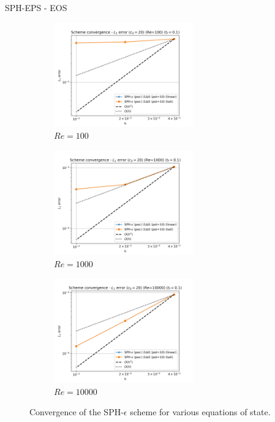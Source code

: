 SPH-EPS - EOS 
\begin{figure}[H]
  \begin{subfigure}{7cm}
  \centering\includegraphics[width=6cm]{Code-Figures/mon2017/eos/dt_pois_conv_c0_20_re_100.png}
  \caption{$Re = 100$}
  \end{subfigure}
  \begin{subfigure}{7cm}
  \centering\includegraphics[width=6cm]{Code-Figures/mon2017/eos/dt_pois_conv_c0_20_re_1000.png}
  \caption{$Re = 1000$}
  \end{subfigure}
  \begin{subfigure}{7cm}
  \centering\includegraphics[width=6cm]{Code-Figures/mon2017/eos/dt_pois_conv_c0_20_re_10000.png}
  \caption{$Re = 10000$}
  \end{subfigure}
  \caption{Convergence of the SPH-$\epsilon$ scheme for various equations of state.}
  \label{fig:sph-eps-eos}
\end{figure}

